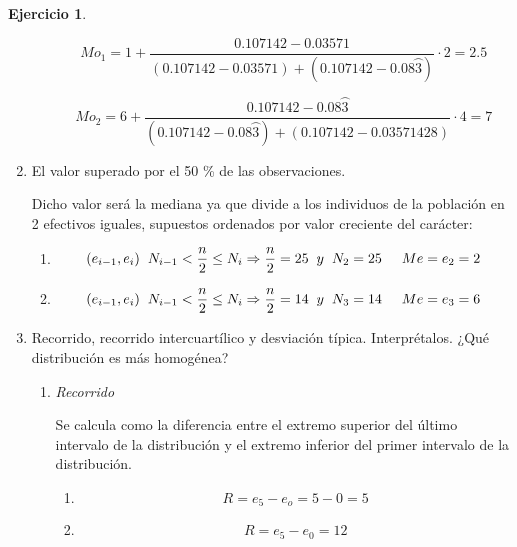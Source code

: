 \documentclass[a4paper, 12pt]{article}
\theoremstyle{definition}
\newtheorem{ej}{Ejercicio}
\begin{document}
\begin{ej}
\begin{enumerate}[label=\textit{\alph*)}]
\begin{enumerate}[label=(\arabic*)]
    \[
    Mo_1 = 1 + \frac{0.107142 - 0.03571}{(0.107142-0.03571) + (0.107142 - 0.08\wideparen{3})} \cdot 2 = 2.5
    \]
    

    \[
    Mo_2 = 6 + \frac{0.107142 - 0.08\wideparen{3}}{(0.107142-0.08\wideparen{3}) + (0.107142 - 0.03571428)} \cdot 4 = 7
    \]
    \end{enumerate}
    \item El valor superado por el 50 \% de las observaciones.
    
    Dicho valor será la mediana ya que divide a los individuos de la población en 2 efectivos iguales, supuestos ordenados por valor creciente del carácter:
    \begin{enumerate}[label=(\arabic*)]
        \item  
        \[
        (e_{i-1}, e_i) \hspace{0.2cm} N_{i-1} < \frac{n}{2} \leq N_i \Rightarrow \frac{n}{2} = 25 \hspace{0.2cm} y \hspace{0.2cm} N_2 = 25 \hspace{0.5cm} Me = e_2 = 2
        \]
        
        \item  
        \[
        (e_{i-1}, e_i) \hspace{0.2cm} N_{i-1} < \frac{n}{2} \leq N_i \Rightarrow \frac{n}{2} = 14 \hspace{0.2cm} y \hspace{0.2cm} N_3 = 14 \hspace{0.5cm} Me = e_3 = 6
        \]
    \end{enumerate}
    
    \item Recorrido, recorrido intercuartílico y desviación típica. Interprétalos. ¿Qué distribución es más homogénea?
    
    \begin{enumerate}[label=\arabic*)]
        \item \textit{Recorrido}
        
    Se calcula como la diferencia entre el extremo superior del último intervalo de la distribución y el extremo inferior del primer intervalo de la distribución.
    
    \begin{enumerate}[label=(\arabic*)]
        \item 
        \[
        R = e_5 - e_o = 5 - 0 = 5
        \]
        
        \item
        \[
        R = e_5 - e_0 = 12
        \]
    \end{enumerate}
    

\end{enumerate}
\end{enumerate}
\end{ej}
\end{document}
